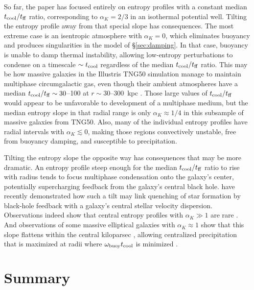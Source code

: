 \documentclass[twocolumn]{aastex63}
\begin{document}
So far, the paper has focused entirely on entropy profiles with a constant median $t_{\rm cool} / t_{\rm ff}$ ratio, corresponding to $\alpha_K = 2/3$ in an isothermal potential well.  Tilting the entropy profile away from that special slope has consequences.  The most extreme case is an isentropic atmosphere with $\alpha_K = 0$, which eliminates buoyancy and produces singularities in the model of \S \ref{sec:damping}.  In that case, buoyancy is unable to damp thermal instability, allowing low-entropy perturbations to condense on a timescale $\sim t_{\rm cool}$ regardless of the median $t_{\rm cool} / t_{\rm ff}$ ratio.  This may be how massive galaxies in the Illustris TNG50 simulation manage to maintain multiphase circumgalactic gas, even though their ambient atmospheres have a median $t_{\rm cool} / t_{\rm ff} \sim 30$--100 at $r \sim 30$--300~kpc \citep{Nelson_2020arXiv200509654N}. Those large values of $t_{\rm \rm cool} / t_{\rm ff}$ would appear to be unfavorable to development of a multiphase medium, but the median entropy slope in that radial range is only $\alpha_K \approx 1/4$ in this subsample of massive galaxies from TNG50. Also, many of the individual entropy profiles have radial intervals with $\alpha_K \lesssim 0$, making those regions convectively unstable, free from buoyancy damping, and susceptible to precipitation.

Tilting the entropy slope the opposite way has consequences that may be more dramatic.  An entropy profile steep enough for the median $t_{\rm cool} / t_{\rm ff}$ ratio to rise with radius tends to focus multiphase condensation onto the galaxy's center, potentially supercharging feedback from the galaxy's central black hole. \citet{Voit_valve_2020arXiv200609381V} have recently demonstrated how such a tilt may link quenching of star formation by black-hole feedback with a galaxy's central stellar velocity dispersion.  Observations indeed show that central entropy profiles with $\alpha_K \gg 1$ are rare \citep[e.g.,][]{Lakhchaura_2018MNRAS.481.4472L,Babyk_2018ApJ...862...39B}.  And observations of some massive elliptical galaxies with $\alpha_K \approx 1$ show that this slope flattens within the central kiloparsec \citep{Werner+2012MNRAS.425.2731W,Frisbie_2020arXiv200612568F}, allowing centralized precipitation that is maximized at radii where $\omega_{\rm buoy} t_{\rm cool}$ is minimized \citep{Voit+2015ApJ...803L..21V}.

\section{Summary}
\label{sec:summary}
\end{document}
